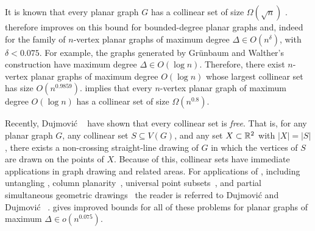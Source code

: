 \documentclass[a4paper,UKenglish]{socg-lipics-v2019}
\begin{document}
It is known that every planar graph $G$ has a collinear set of size
$\Omega(\sqrt{n})$ \cite{bose.dujmovic.ea:polynomial,dujmovic:utility}
.  therefore improves on this bound for bounded-degree planar
graphs and, indeed for the family of $n$-vertex planar graphs of maximum
degree $\Delta\in O(n^{\delta})$, with $\delta < 0.075$.  For example,
the graphs generated by Gr\"unbaum and Walther's construction have maximum
degree $\Delta \in O(\log n)$.  Therefore, there exist $n$-vertex planar
graphs of maximum degree $O(\log n)$ whose largest collinear set has size
$O(n^{0.9859})$.   implies that every
$n$-vertex planar graph of maximum degree $O(\log n)$ has a collinear
set of size $\Omega(n^{0.8})$.

Recently, Dujmovi\'c \etal\ \cite{dujmovic.frati.ea:every} have shown
that every collinear set is \emph{free}. That is, for any planar graph
$G$, any collinear set $S\subseteq V(G)$, and any set $X\subset\mathbb{R}^2$
with $|X|=|S|$, there exists a non-crossing straight-line drawing of $G$
in which the vertices of $S$ are drawn on the points of $X$.  Because of
this, collinear sets have immediate applications in graph drawing and
related areas.  For applications of , including untangling
\cite{cibulka:untangling,pach.tardos:untangling,watanabe:open,goaoc.kratochvil.ea:untangling,kang.pikhurko.ea:untangling,bose.dujmovic.ea:polynomial,dalozzo.dujmovic.ea:drawing,dujmovic:utility,ravsky.verbitsky:on},
column
planarity~\cite{barba.evans.ea:column,evans.kusters.ea:column,dalozzo.dujmovic.ea:drawing,dujmovic:utility},
universal point
subsets~\cite{digiacomo.liotta.ea:how,angelini.binucci.ea:universal,dalozzo.dujmovic.ea:drawing,dujmovic:utility},
and partial simultaneous geometric
drawings~\cite{evans.kusters.ea:column,barba.hoffmann.ea:column,angelini.evans.ea:sefe,blasius.kobourov.ea:simultaneous,dujmovic:utility}
the reader is referred to Dujmovi\'c \cite{dujmovic:utility}
and Dujmovi\'c \etal\ \cite[Section~1.1]{dujmovic.frati.ea:every}.
 gives improved bounds for all of these problems for planar
graphs of maximum $\Delta\in o(n^{0.075})$.
\end{document}
